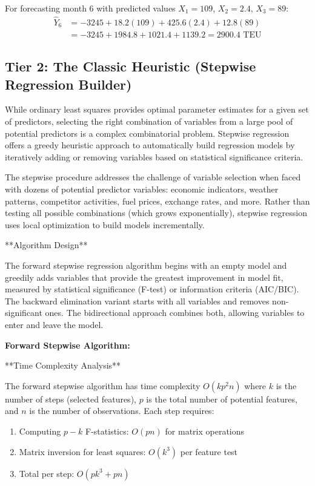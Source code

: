 \documentclass{article}
\begin{document}
For forecasting month 6 with predicted values $X_1 = 109$, $X_2 = 2.4$, $X_3 = 89$:
\begin{align}
\hat{Y}_6 &= -3245 + 18.2(109) + 425.6(2.4) + 12.8(89) \\
&= -3245 + 1984.8 + 1021.4 + 1139.2 = 2900.4 \text{ TEU}
\end{align}

\subsection{Tier 2: The Classic Heuristic (Stepwise Regression Builder)}

While ordinary least squares provides optimal parameter estimates for a given set of predictors, selecting the right combination of variables from a large pool of potential predictors is a complex combinatorial problem. Stepwise regression offers a greedy heuristic approach to automatically build regression models by iteratively adding or removing variables based on statistical significance criteria.

The stepwise procedure addresses the challenge of variable selection when faced with dozens of potential predictor variables: economic indicators, weather patterns, competitor activities, fuel prices, exchange rates, and more. Rather than testing all possible combinations (which grows exponentially), stepwise regression uses local optimization to build models incrementally.

**Algorithm Design**

The forward stepwise regression algorithm begins with an empty model and greedily adds variables that provide the greatest improvement in model fit, measured by statistical significance (F-test) or information criteria (AIC/BIC). The backward elimination variant starts with all variables and removes non-significant ones. The bidirectional approach combines both, allowing variables to enter and leave the model.

\textbf{Forward Stepwise Algorithm:}



**Time Complexity Analysis**

The forward stepwise algorithm has time complexity $O(kp^2n)$ where $k$ is the number of steps (selected features), $p$ is the total number of potential features, and $n$ is the number of observations. Each step requires:
\begin{enumerate}
\item Computing $p-k$ F-statistics: $O(pn)$ for matrix operations
\item Matrix inversion for least squares: $O(k^3)$ per feature test
\item Total per step: $O(pk^3 + pn)$
\end{enumerate}
\end{document}
